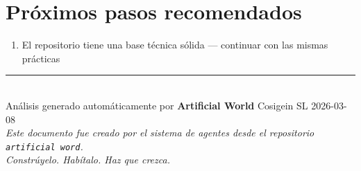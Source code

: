 \documentclass[10pt,a4paper]{article}
\begin{document}
\section{Próximos pasos recomendados}

\begin{enumerate}[leftmargin=1.5em, itemsep=4pt]
  \item El repositorio tiene una base técnica sólida — continuar con las mismas prácticas
\end{enumerate}

\vfill
\begin{center}
  \color{muted}\small\rule{0.6\linewidth}{0.4pt}\\[4pt]
  Análisis generado automáticamente por \textbf{Artificial World} \textperiodcentered{} Cosigein SL \textperiodcentered{} 2026-03-08\\
  \textit{Este documento fue creado por el sistema de agentes desde el repositorio \texttt{artificial word}.}\\
  \textit{Constrúyelo. Habítalo. Haz que crezca.}
\end{center}
\end{document}
